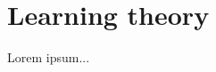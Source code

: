 



\maketitle


\tableofcontents

\section{Learning theory}\label{learning-theory}

Lorem ipsum...


\printbibliography

